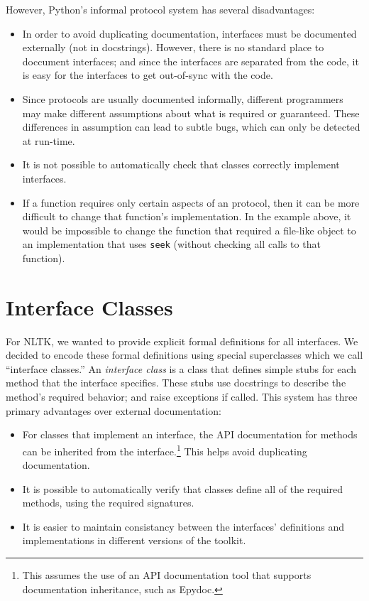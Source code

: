\documentclass[11pt]{article}
\begin{document}
\newpage\noindent
However, Python's informal protocol system has several disadvantages:
\begin{itemize}
\item In order to avoid duplicating documentation, interfaces must be
  documented externally (not in docstrings).  However, there is no
  standard place to doccument interfaces; and since the interfaces are
  separated from the code, it is easy for the interfaces to get
  out-of-sync with the code.
\item Since protocols are usually documented informally, different
  programmers may make different assumptions about what is required or
  guaranteed.  These differences in assumption can lead to subtle
  bugs, which can only be detected at run-time.
\item It is not possible to automatically check that classes correctly
  implement interfaces.
\item If a function requires only certain aspects of an protocol, then
  it can be more difficult to change that function's implementation.
  In the example above, it would be impossible to change the function
  that required a file-like object to an implementation that uses
  \texttt{seek} (without checking all calls to that function).
\end{itemize}


\section{Interface Classes}

For NLTK, we wanted to provide explicit formal definitions for all
interfaces.  We decided to encode these formal definitions using
special superclasses which we call ``interface classes.''  An
\textit{interface class} is a class that defines simple stubs for each
method that the interface specifies.  These stubs use docstrings to
describe the method's required behavior; and raise exceptions if
called.  This system has three primary advantages over external
documentation: 

\begin{itemize}
\item For classes that implement an interface, the API documentation
  for methods can be inherited from the interface.\footnote{This
    assumes the use of an API documentation tool that supports
    documentation inheritance, such as Epydoc.}  This helps avoid
  duplicating documentation.
\item It is possible to automatically verify that classes define all
  of the required methods, using the required signatures.
\item It is easier to maintain consistancy between the interfaces'
  definitions and implementations in different versions of the
  toolkit.
\end{itemize}
\end{document}
